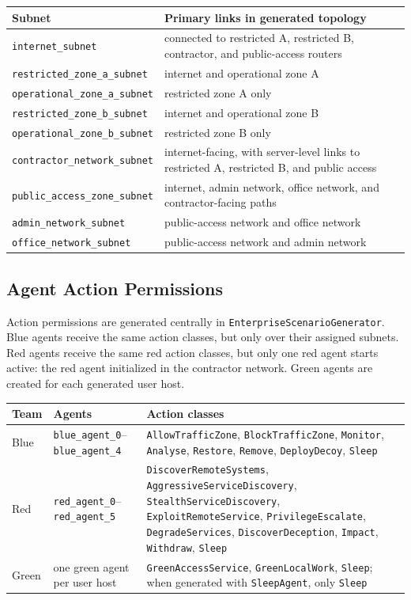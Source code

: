 \begin{longtable}{p{}p{}}
\toprule
\textbf{Subnet} & \textbf{Primary links in generated topology} \\
\midrule
\texttt{internet\_subnet} & connected to restricted A, restricted B, contractor, and public-access routers \\
\texttt{restricted\_zone\_a\_subnet} & internet and operational zone A \\
\texttt{operational\_zone\_a\_subnet} & restricted zone A only \\
\texttt{restricted\_zone\_b\_subnet} & internet and operational zone B \\
\texttt{operational\_zone\_b\_subnet} & restricted zone B only \\
\texttt{contractor\_network\_subnet} & internet-facing, with server-level links to restricted A, restricted B, and public access \\
\texttt{public\_access\_zone\_subnet} & internet, admin network, office network, and contractor-facing paths \\
\texttt{admin\_network\_subnet} & public-access network and office network \\
\texttt{office\_network\_subnet} & public-access network and admin network \\
\bottomrule
\end{longtable}

\subsection{Agent Action Permissions}

Action permissions are generated centrally in
\texttt{EnterpriseScenarioGenerator}. Blue agents receive the same action
classes, but only over their assigned subnets. Red agents receive the same red
action classes, but only one red agent starts active: the red agent initialized
in the contractor network. Green agents are created for each generated user
host.

\begin{longtable}{p{}p{}p{}}
\toprule
\textbf{Team} & \textbf{Agents} & \textbf{Action classes} \\
\midrule
Blue & \texttt{blue\_agent\_0}--\texttt{blue\_agent\_4} & \texttt{AllowTrafficZone}, \texttt{BlockTrafficZone}, \texttt{Monitor}, \texttt{Analyse}, \texttt{Restore}, \texttt{Remove}, \texttt{DeployDecoy}, \texttt{Sleep} \\
Red & \texttt{red\_agent\_0}--\texttt{red\_agent\_5} & \texttt{DiscoverRemoteSystems}, \texttt{AggressiveServiceDiscovery}, \texttt{StealthServiceDiscovery}, \texttt{ExploitRemoteService}, \texttt{PrivilegeEscalate}, \texttt{DegradeServices}, \texttt{DiscoverDeception}, \texttt{Impact}, \texttt{Withdraw}, \texttt{Sleep} \\
Green & one green agent per user host & \texttt{GreenAccessService}, \texttt{GreenLocalWork}, \texttt{Sleep}; when generated with \texttt{SleepAgent}, only \texttt{Sleep} \\
\bottomrule
\end{longtable}

